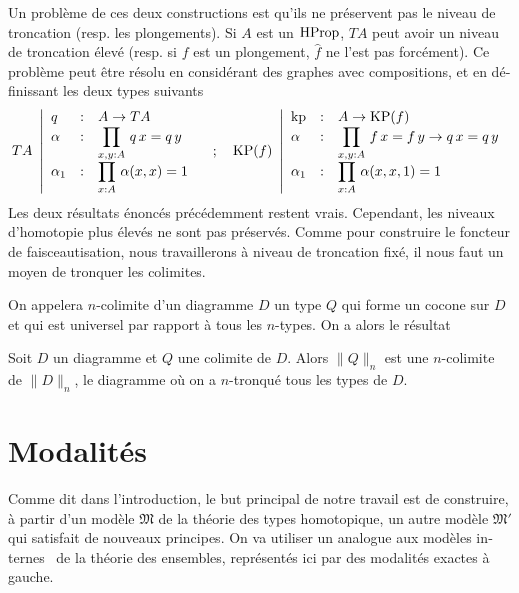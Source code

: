 \begin{otherlanguage}{french}
Un problème de ces deux constructions est qu'ils ne préservent pas le
niveau de troncation (resp. les plongements). Si $A$ est un $\operatorname{HProp}$,
$TA$ peut avoir un niveau de troncation élevé (resp. si $f$ est un
plongement, $\widehat f$ ne l'est pas forcément). Ce problème peut
être résolu en considérant des graphes avec compositions, et en
définissant les deux types suivants
\[
  TA~\left|
    \begin{array}{lll}
      q&:& A\to TA \\
      \alpha&:& \displaystyle{\prod_{x,y:A}\, q\, x = q\, y} \\
      \alpha_1&:& \displaystyle{\prod_{x:A}\, \alpha(x,x) = 1}
    \end{array}
  \right.
  \quad ; \quad
  \operatorname{KP}(f)~\left|
    \begin{array}{lll}
      \operatorname{kp}&:&A\to \operatorname{KP}(f) \\
      \alpha&:& \displaystyle{\prod_{x,y:A}\, f\, x = f\, y \to q\, x = q\, y} \\
      \alpha_1&:& \displaystyle{\prod_{x:A}\, \alpha(x,x,1) = 1}
    \end{array}    
  \right.
\]
Les deux résultats énoncés précédemment restent vrais. Cependant, les
niveaux d'homotopie plus élevés ne sont pas préservés.
Comme pour construire le foncteur de faisceautisation, nous travaillerons à
niveau de troncation fixé, il nous faut un moyen de tronquer les
colimites.

On appelera $n$-colimite d'un diagramme $D$ un type $Q$ qui forme un
cocone sur $D$ et qui est universel par rapport à tous les
$n$-types. On a alors le résultat
\begin{lemfr}
  Soit $D$ un diagramme et $Q$ une colimite de $D$. Alors $\|Q\|_n$
  est une $n$-colimite de $\|D\|_n$, le diagramme où on a $n$-tronqué
  tous les types de $D$.
\end{lemfr}

\section{Modalités}

Comme dit dans l'introduction, le but principal de notre travail est
de construire, à partir d'un modèle $\mathfrak M$ de la théorie des
types homotopique, un autre modèle $\mathfrak M'$ qui satisfait 
de nouveaux principes.
On va utiliser un analogue aux modèles internes~\cite{kunen} de la
théorie des ensembles, représentés ici par des modalités exactes à
gauche.




\end{otherlanguage}
